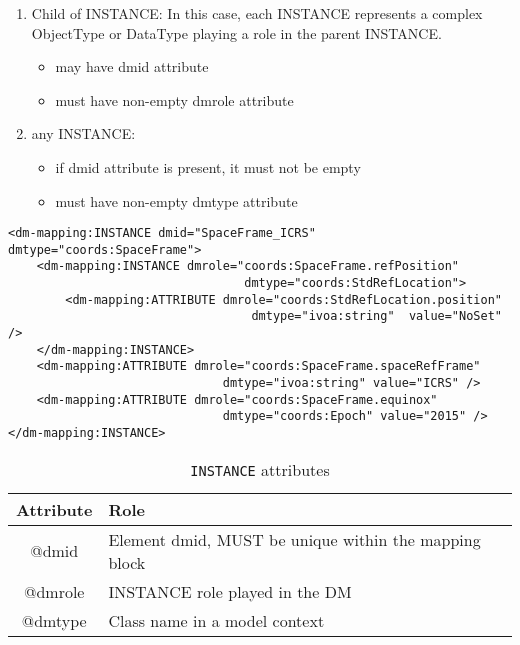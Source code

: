 \begin{enumerate}
\item Child of INSTANCE: 
     In this case, each INSTANCE represents 
     a complex ObjectType or DataType playing a role in the parent INSTANCE.     
     \begin{itemize}
        \item may have dmid attribute
        \item must have non-empty dmrole attribute
     \end{itemize}
           
\item any INSTANCE:     
   \begin{itemize}
        \item if dmid attribute is present, it must not be empty
        \item must have non-empty dmtype attribute
    \end{itemize}
\end{enumerate}  
    
   
\begin{lstlisting}[frame=single,caption={Example of INSTANCE child of GLOBALS},style=XML,basicstyle=\tiny]
<dm-mapping:INSTANCE dmid="SpaceFrame_ICRS" dmtype="coords:SpaceFrame">
	<dm-mapping:INSTANCE dmrole="coords:SpaceFrame.refPosition"
                                 dmtype="coords:StdRefLocation">
		<dm-mapping:ATTRIBUTE dmrole="coords:StdRefLocation.position" 
		                          dmtype="ivoa:string"  value="NoSet" />
	</dm-mapping:INSTANCE>
	<dm-mapping:ATTRIBUTE dmrole="coords:SpaceFrame.spaceRefFrame" 
	                          dmtype="ivoa:string" value="ICRS" />
	<dm-mapping:ATTRIBUTE dmrole="coords:SpaceFrame.equinox" 
	                          dmtype="coords:Epoch"	value="2015" />
</dm-mapping:INSTANCE>
\end{lstlisting}   
   

\begin{table}[!htbp]
\small
\centering
\begin{tabulary}{\linewidth}{|c|J|}       
       \hline 
            \textbf{Attribute} & 
            \textbf {Role}\\
       \hline         \hline  
            @dmid & 
            Element dmid, MUST be unique within the mapping block  \\
        \hline 
            @dmrole & 
            INSTANCE role played in the DM \\
        \hline 
            @dmtype & 
            Class name in a model context\\
        \hline 
     \end{tabulary}
     \caption{\texttt{INSTANCE} attributes} 
     \label{tbl:instance-att}
 \end{table}   
 


